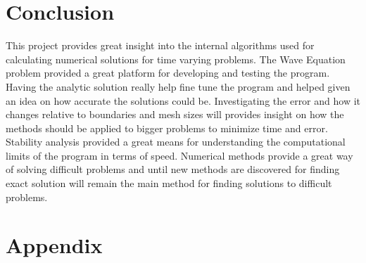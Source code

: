 \documentclass[paper=a4, fontsize=11pt, abstract=on]{scrartcl}
\numberwithin{equation}{section}		%
\numberwithin{figure}{section}			%
\numberwithin{table}{section}				%
\begin{document}
\section{Conclusion}
This project provides great insight into the internal algorithms used for calculating numerical solutions for time varying problems. The Wave Equation problem provided a great platform for developing and testing the program. Having the analytic solution really help fine tune the program and helped given an idea on how accurate the solutions could be. Investigating the error and how it changes relative to boundaries and mesh sizes will provides insight on how the methods should be applied to bigger problems to minimize time and error. Stability analysis provided a great means for understanding the computational limits of the program in terms of speed. Numerical methods provide a great way of solving difficult problems and until new methods are discovered for finding exact solution will remain the main method for finding solutions to difficult problems. 






\appendix
\section{Appendix} \label{App:Appendix}
\end{document}

